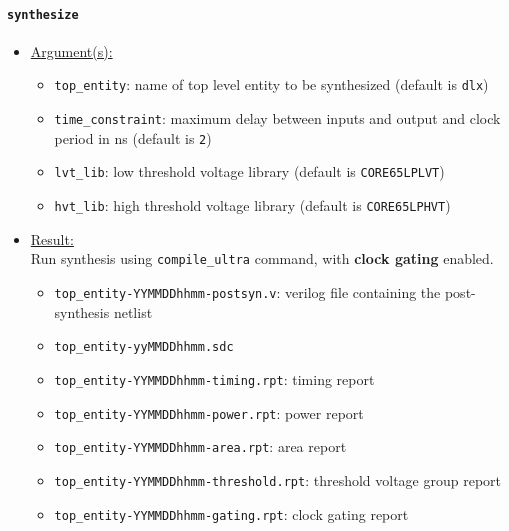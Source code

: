 \paragraph{\texttt{synthesize}}
\begin{itemize}
	\item \underline{Argument(s):}
		\begin{itemize}
			\item \texttt{top\_entity}: name of top level entity to
				be synthesized (default is \texttt{dlx})
			\item \texttt{time\_constraint}: maximum delay between
				inputs and output and clock period in ns
				(default is \texttt{2})
			\item \texttt{lvt\_lib}: low threshold voltage library
				(default is \texttt{CORE65LPLVT})
			\item \texttt{hvt\_lib}: high threshold voltage library
				(default is \texttt{CORE65LPHVT})
		\end{itemize}
	\item \underline{Result:} \\
		Run synthesis using \texttt{compile\_ultra} command, with
		\textbf{clock gating} enabled.
		\begin{itemize}
			\item \texttt{top\_entity-YYMMDDhhmm-postsyn.v}: verilog
				file containing the post-synthesis netlist
			\item \texttt{top\_entity-yyMMDDhhmm.sdc}
			\item \texttt{top\_entity-YYMMDDhhmm-timing.rpt}: timing
				report
			\item \texttt{top\_entity-YYMMDDhhmm-power.rpt}: power
				report
			\item \texttt{top\_entity-YYMMDDhhmm-area.rpt}: area
				report
			\item \texttt{top\_entity-YYMMDDhhmm-threshold.rpt}:
				threshold voltage group report
			\item \texttt{top\_entity-YYMMDDhhmm-gating.rpt}: clock
				gating report
		\end{itemize}
\end{itemize}

